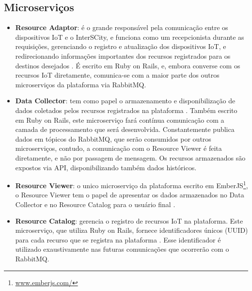 \subsection{Microserviços}
\begin{itemize}
    \item \textbf{Resource Adaptor}: é o grande responsável pela comunicação
entre os dispositivos IoT e o InterSCity, e funciona como um recepcionista
durante as requisições, gerenciando o registro e atualização dos
dispositivos IoT, e redirecionando informações importantes dos recursos
registrados para os destinos desejados \cite{delesposte2017}. É escrito em
Ruby on Rails, e, embora converse com os recursos IoT diretamente, comunica-se
com a maior parte dos outros microserviços da plataforma via RabbitMQ.

    \item \textbf{Data Collector}: tem como papel o armazenamento e
disponibilização de dados coletados pelos recursos registrados na plataforma
\cite{delesposte2017}. Também escrito em Ruby on Rails, este microserviço fará
contínua comunicação com a camada de processamento que será desenvolvida.
Constantemente publica dados em tópicos do RabbitMQ, que serão consumidos por
outros microserviços, contudo, a comunicação com o Resource Viewer é feita
diretamente, e não por passagem de mensagem. Os recursos armazenados são
expostos via API, disponibilizando também dados históricos.

    \item \textbf{Resource Viewer}: o unico microserviço da plataforma escrito em
EmberJS\footnote{\url{www.emberjs.com/}}, o Resource Viewer tem o papel de
apresentar os dados armazenados no Data Collector e no Resource Catalog para o
usuário final \cite{delesposte2017}.

    \item \textbf{Resource Catalog}: gerencia o registro de recursos IoT
na plataforma. Este microserviço, que utiliza Ruby on Rails, fornece
identificadores únicos (UUID) para cada recurso que se registra na plataforma
\cite{delesposte2017}.
Esse identificador é utilizado exaustivamente nas futuras comunicações que
ocorrerão com o RabbitMQ.

\end{itemize}
